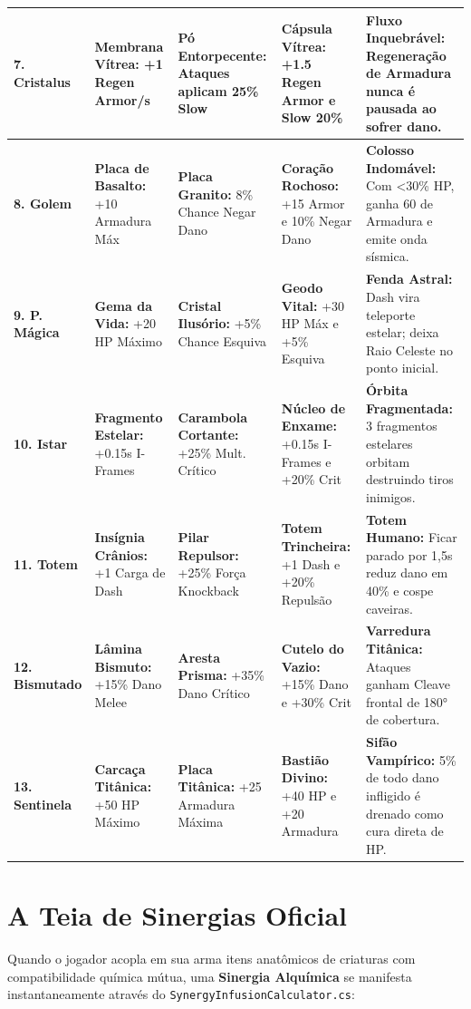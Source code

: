 \documentclass[a4paper,12pt]{report}
\begin{document}
\begin{center}
\begin{tabular}{|l|p{3.2cm}|p{3.2cm}|p{3.2cm}|p{3.8cm}|}
    \hline
    \textbf{7. Cristalus} & \textbf{Membrana Vítrea:} +1 Regen Armor/s & \textbf{Pó Entorpecente:} Ataques aplicam 25\% Slow & \textbf{Cápsula Vítrea:} +1.5 Regen Armor e Slow 20\% & \textbf{Fluxo Inquebrável:} Regeneração de Armadura nunca é pausada ao sofrer dano. \\
    \hline
    \textbf{8. Golem} & \textbf{Placa de Basalto:} +10 Armadura Máx & \textbf{Placa Granito:} 8\% Chance Negar Dano & \textbf{Coração Rochoso:} +15 Armor e 10\% Negar Dano & \textbf{Colosso Indomável:} Com <30\% HP, ganha 60 de Armadura e emite onda sísmica. \\
    \hline
    \textbf{9. P. Mágica} & \textbf{Gema da Vida:} +20 HP Máximo & \textbf{Cristal Ilusório:} +5\% Chance Esquiva & \textbf{Geodo Vital:} +30 HP Máx e +5\% Esquiva & \textbf{Fenda Astral:} Dash vira teleporte estelar; deixa Raio Celeste no ponto inicial. \\
    \hline
    \textbf{10. Istar} & \textbf{Fragmento Estelar:} +0.15s I-Frames & \textbf{Carambola Cortante:} +25\% Mult. Crítico & \textbf{Núcleo de Enxame:} +0.15s I-Frames e +20\% Crit & \textbf{Órbita Fragmentada:} 3 fragmentos estelares orbitam destruindo tiros inimigos. \\
    \hline
    \textbf{11. Totem} & \textbf{Insígnia Crânios:} +1 Carga de Dash & \textbf{Pilar Repulsor:} +25\% Força Knockback & \textbf{Totem Trincheira:} +1 Dash e +20\% Repulsão & \textbf{Totem Humano:} Ficar parado por 1,5s reduz dano em 40\% e cospe caveiras. \\
    \hline
    \textbf{12. Bismutado} & \textbf{Lâmina Bismuto:} +15\% Dano Melee & \textbf{Aresta Prisma:} +35\% Dano Crítico & \textbf{Cutelo do Vazio:} +15\% Dano e +30\% Crit & \textbf{Varredura Titânica:} Ataques ganham Cleave frontal de 180° de cobertura. \\
    \hline
    \textbf{13. Sentinela} & \textbf{Carcaça Titânica:} +50 HP Máximo & \textbf{Placa Titânica:} +25 Armadura Máxima & \textbf{Bastião Divino:} +40 HP e +20 Armadura & \textbf{Sifão Vampírico:} 5\% de todo dano infligido é drenado como cura direta de HP. \\
    \hline
\end{tabular}
\end{center}

\section{A Teia de Sinergias Oficial}
Quando o jogador acopla em sua arma itens anatômicos de criaturas com compatibilidade química mútua, uma \textbf{Sinergia Alquímica} se manifesta instantaneamente através do \texttt{SynergyInfusionCalculator.cs}:
\end{document}
